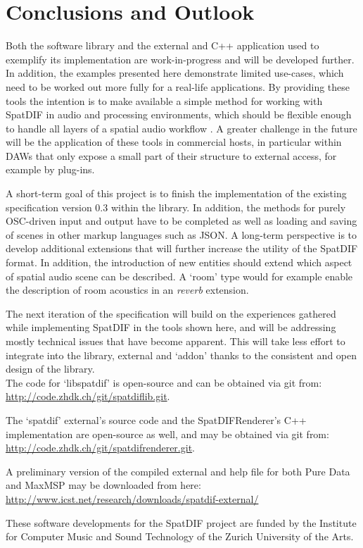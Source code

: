 \documentclass{article}
\begin{document}

\section{Conclusions and Outlook}\label{sec:conclusions_future_work}

Both the software library and the external and C++ application used to exemplify its implementation are work-in-progress and will be developed further.
In addition, the examples presented here demonstrate limited use-cases, which need to be worked out more fully for a real-life applications.
By providing these tools the intention is to make available a simple method for working with SpatDIF in audio and processing environments, which should be flexible enough to handle all layers of a spatial audio workflow \cite{PetersSMC09}.
A greater challenge in the future will be the application of these tools in commercial hosts, in particular within DAWs that only expose a small part of their structure to external access, for example by plug-ins.

A short-term goal of this project is to finish the implementation of the existing specification version 0.3 \cite{SpatDIF_03} within the library.
In addition, the methods for purely OSC-driven input and output have to be completed as well as loading and saving of scenes in other markup languages such as JSON.
A long-term perspective is to develop additional extensions that will further increase the utility of the SpatDIF format.
In addition, the introduction of new entities should extend which aspect of spatial audio scene can be described. 
A `room' type would for example enable the description of room acoustics in an \emph{reverb} extension.

The next iteration of the specification will build on the experiences gathered while implementing SpatDIF in the tools shown here, and will be addressing mostly technical issues that have become apparent.
This will take less effort to integrate into the library, external and `addon' thanks to the consistent and open design of the library.\\

The code for `libspatdif' is open-source and can be obtained via git from: \url{http://code.zhdk.ch/git/spatdiflib.git}.
 
The `spatdif' external's source code and the SpatDIFRenderer's C++ implementation are open-source as well, and may be obtained via git from: \url{http://code.zhdk.ch/git/spatdifrenderer.git}.

A preliminary version of the compiled external and help file for both Pure Data and MaxMSP may be downloaded from here: \url{http://www.icst.net/research/downloads/spatdif-external/}


\balance
\begin{acknowledgments}
These software developments for the SpatDIF project are funded by the Institute for Computer Music and Sound Technology of the Zurich University of the Arts.
\end{acknowledgments} 



\printbibliography
\end{document}
